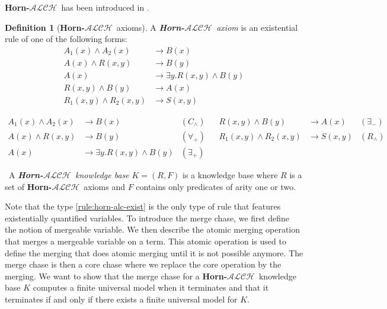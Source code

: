 \documentclass{article}
\theoremstyle{definition}
\newtheorem{definition}{Definition}[section]
\theoremstyle{remark}
\newcommand{\ALCH}{\textbf{Horn-$\mathcal{ALCH}$}}
\begin{document}
\ALCH\ has been introduced in \cite{Horn-ALC}.

\begin{definition}[\ALCH\ axioms]
A \emph{\ALCH\ axiom} is an existential rule of one of the following forms:
\begin{align}
A_1(x) \wedge A_2(x) &\rightarrow B(x) \\
A(x) \wedge R(x,y) &\rightarrow B(y) \\
A(x) &\rightarrow \exists y.R(x,y) \wedge B(y) \label{rule:horn-alc-exist} \\
R(x,y) \wedge B(y) &\rightarrow A(x) \\
R_1(x,y) \wedge R_2(x,y) &\rightarrow S(x,y)
\end{align}

\begin{align*}
A_1(x) \wedge A_2(x) &\rightarrow B(x) & (C_\wedge)&& R(x,y) \wedge B(y) &\rightarrow A(x) & (\exists_-) \\
A(x) \wedge R(x,y) &\rightarrow B(y)  & (\forall_+) && R_1(x,y) \wedge R_2(x,y) &\rightarrow S(x,y) & (R_\wedge)\\
A(x) &\rightarrow \exists y.R(x,y) \wedge B(y) & (\exists_+) \label{rule:horn-alc-exist} 
\end{align*}


\
A \emph{\ALCH\ knowledge base} $K = (R,F)$ is a knowledge base where $R$ is a set of \ALCH\ axioms and $F$ contains only predicates of arity one or two. 

\end{definition}

Note that the type \ref{rule:horn-alc-exist} is the only type of rule that features existentially quantified variables. To introduce the merge chase, we first define the notion of mergeable variable. We then describe the atomic merging operation that merges a mergeable variable on a term. This atomic operation is used to define the merging that does atomic merging until it is not possible anymore. The merge chase is then a core chase where we replace the core operation by the merging. We want to show that the merge chase for a \ALCH\ knowledge base $K$ computes a finite universal model when it terminates and that it terminates if and only if there exists a finite universal model for $K$. 
\end{document}
